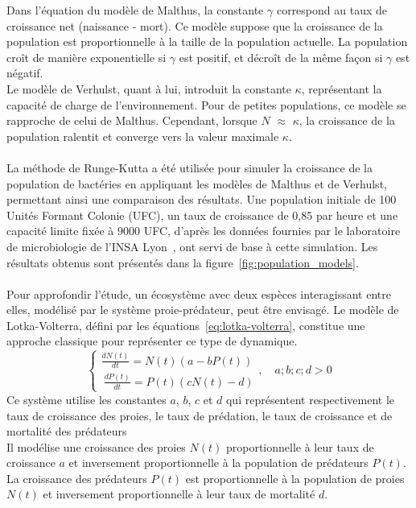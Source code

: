\documentclass{article}
\begin{document}
Dans l'équation du modèle de Malthus, la constante $\gamma$ correspond au taux de croissance net (naissance - mort). Ce modèle suppose que la croissance de la population est proportionnelle à la taille de la population actuelle. La population croît de manière exponentielle si $\gamma$ est positif, et décroît de la même façon si $\gamma$ est négatif.\\
Le modèle de Verhulst, quant à lui, introduit la constante $\kappa$, représentant la capacité de charge de l'environnement. Pour de petites populations, ce modèle se rapproche de celui de Malthus. Cependant, lorsque $N$ $\approx$ $\kappa$, la croissance de la population ralentit et converge vers la valeur maximale $\kappa$.
\\ \\
La méthode de Runge-Kutta a été utilisée pour simuler la croissance de la population de bactéries en appliquant les modèles de Malthus et de Verhulst, permettant ainsi une comparaison des résultats. Une population initiale de 100 Unités Formant Colonie (UFC), un taux de croissance de 0,85 par heure et une capacité limite fixée à 9000 UFC, d'après les données fournies par le laboratoire de microbiologie de l'INSA Lyon~\cite{insa2024microorganismes}, ont servi de base à cette simulation. Les résultats obtenus sont présentés dans la figure~\ref{fig:population_models}.\\ \\
Pour approfondir l'étude, un écosystème avec deux espèces interagissant entre elles, modélisé par le système proie-prédateur, peut être envisagé. Le modèle de Lotka-Volterra, défini par les équations~\ref{eq:lotka-volterra}, constitue une approche classique pour représenter ce type de dynamique.
\begin{equation}
  \label{eq:lotka-volterra}
  \begin{cases}
    \frac{dN(t)}{dt} = N(t) (a-bP(t)) \\\
    \frac{dP(t)}{dt} = P(t) (cN(t)-d)
  \end{cases}, \quad a;b;c;d > 0
\end{equation}
Ce système utilise les constantes $a$, $b$, $c$ et $d$ qui représentent respectivement le taux de croissance des proies, le taux de prédation, le taux de croissance et de mortalité des prédateurs\\
Il modélise une croissance des proies $N(t)$ proportionnelle à leur taux de croissance $a$ et inversement proportionnelle à la population de prédateurs $P(t)$. La croissance des prédateurs $P(t)$ est proportionnelle à la population de proies $N(t)$ et inversement proportionnelle à leur taux de mortalité $d$.\\ \\
\end{document}

